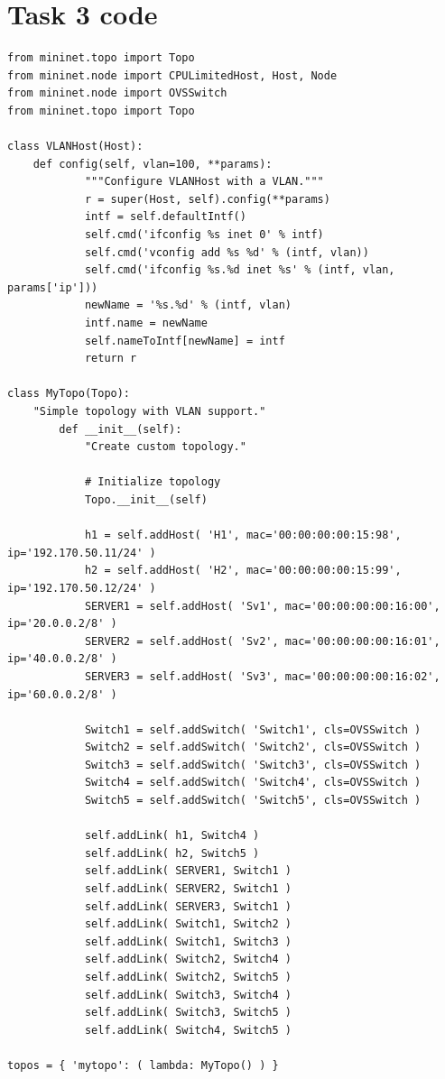 \documentclass{article}
\begin{document}
\section{Task 3 code}
\begin{lstlisting}
from mininet.topo import Topo  
from mininet.node import CPULimitedHost, Host, Node
from mininet.node import OVSSwitch
from mininet.topo import Topo

class VLANHost(Host):
	def config(self, vlan=100, **params):
        	"""Configure VLANHost with a VLAN."""
        	r = super(Host, self).config(**params)
        	intf = self.defaultIntf()
        	self.cmd('ifconfig %s inet 0' % intf)
        	self.cmd('vconfig add %s %d' % (intf, vlan))
        	self.cmd('ifconfig %s.%d inet %s' % (intf, vlan, params['ip']))
        	newName = '%s.%d' % (intf, vlan)
        	intf.name = newName
        	self.nameToIntf[newName] = intf
        	return r

class MyTopo(Topo):  
	"Simple topology with VLAN support."
    	def __init__(self):
        	"Create custom topology."

	        # Initialize topology
	        Topo.__init__(self)

	        h1 = self.addHost( 'H1', mac='00:00:00:00:15:98', ip='192.170.50.11/24' )
	        h2 = self.addHost( 'H2', mac='00:00:00:00:15:99', ip='192.170.50.12/24' )
	        SERVER1 = self.addHost( 'Sv1', mac='00:00:00:00:16:00', ip='20.0.0.2/8' )
	        SERVER2 = self.addHost( 'Sv2', mac='00:00:00:00:16:01', ip='40.0.0.2/8' )
	        SERVER3 = self.addHost( 'Sv3', mac='00:00:00:00:16:02', ip='60.0.0.2/8' )

	        Switch1 = self.addSwitch( 'Switch1', cls=OVSSwitch )
	        Switch2 = self.addSwitch( 'Switch2', cls=OVSSwitch )
	        Switch3 = self.addSwitch( 'Switch3', cls=OVSSwitch )
	        Switch4 = self.addSwitch( 'Switch4', cls=OVSSwitch )
	        Switch5 = self.addSwitch( 'Switch5', cls=OVSSwitch )

	        self.addLink( h1, Switch4 )
	        self.addLink( h2, Switch5 )
	        self.addLink( SERVER1, Switch1 )
	        self.addLink( SERVER2, Switch1 )
	        self.addLink( SERVER3, Switch1 )
	        self.addLink( Switch1, Switch2 )
	        self.addLink( Switch1, Switch3 )
	        self.addLink( Switch2, Switch4 )
	        self.addLink( Switch2, Switch5 )
	        self.addLink( Switch3, Switch4 )
	        self.addLink( Switch3, Switch5 )
	        self.addLink( Switch4, Switch5 )

topos = { 'mytopo': ( lambda: MyTopo() ) }
\end{lstlisting}
\end{document}
